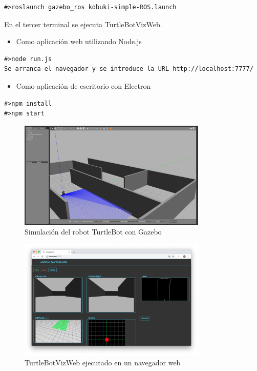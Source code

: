 \begin{lstlisting}[caption= Ejecución del driver de ROS label=cod.gazeboturtle]
#>roslaunch gazebo_ros kobuki-simple-ROS.launch
\end{lstlisting}

En el tercer terminal se ejecuta TurtleBotVizWeb.

\begin{itemize}
\item 
Como aplicación web utilizando Node.js
\end{itemize}
\begin{lstlisting}[caption= Ejecución con Node.js, label=cod.turtlenodejs]
#>node run.js
Se arranca el navegador y se introduce la URL http://localhost:7777/
\end{lstlisting}
\begin{itemize}
\item 
Como aplicación de escritorio con Electron
\end{itemize}
\begin{lstlisting}[caption= Ejecución con Electron, label=cod.turtleelectron]
#>npm install
#>npm start
\end{lstlisting}

\begin{figure}[H]
  \begin{center}
    \includegraphics[width=0.8\textwidth]{figures/gazeboturtle.png}
    		\caption{Simulación del robot TurtleBot con Gazebo}
		\label{fig.gazeboturtle}
		\end{center}
\end{figure}
\begin{figure}[H]
  \begin{center}
    \includegraphics[width=0.8\textwidth]{figures/TurtleBotviznode.png}
    		\caption{TurtleBotVizWeb ejecutado en un navegador web}
		\label{fig.TurtleBotviznode}
		\end{center}
\end{figure}

